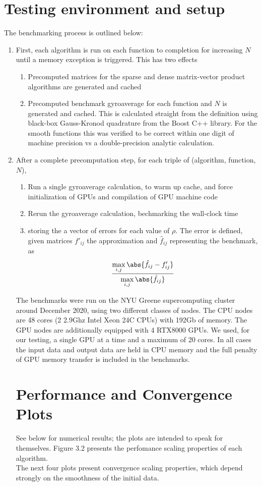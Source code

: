 \section{Testing environment and setup\label{sec:Environment}}
The benchmarking process is outlined below:
\begin{enumerate}
	\item First, each algorithm is run on each function to completion for increasing $N$ until a memory exception is triggered.  This has two effects
	\begin{enumerate}
		\item Precomputed matrices for the sparse and dense matrix-vector product algorithms are generated and cached
		\item Precomputed benchmark gyroaverage for each function and $N$ is generated and cached.  This is calculated straight from the definition using black-box Gauss-Kronod quadrature from the Boost C++ library.  For the smooth functions this was verified to be correct within one digit of machine precision vs a double-precision analytic calculation.  
	\end{enumerate}
	\item After a complete precomputation step, for each triple of (algorithm, function, $N$),
	\begin{enumerate}
		\item Run a single gyroaverage calculation, to warm up cache, and force initialization of GPUs and compilation of GPU machine code
		\item Rerun the gyroaverage calculation, bechmarking the wall-clock time
		\item storing the a vector of errors for each value of $\rho$.  The error is defined, given matrices $f'_{ij}$ the approximation and $\hat{f}_{ij}$ representing the benchmark, as
		\[  \frac{\max\limits_{i,j} \abs{\hat{f}_{ij} - f'_{ij} } }{\max\limits_{i,j} \abs{\hat{f}_{ij}} } \] 
	\end{enumerate}
	The benchmarks were run on the NYU Greene supercomputing cluster around December 2020, using two different classes of nodes.  The CPU nodes are 48 cores (2 2.9Ghz Intel Xeon 24C CPUs) with 192Gb of memory.  The GPU nodes are additionally equipped with 4 RTX8000 GPUs.  We used, for our testing, a single GPU at a time and a maximum of 20 cores.  In all cases the input data and output data are held in CPU memory and the full penalty of GPU memory transfer is included in the benchmarks.  
	\section{Performance and Convergence Plots}
	See below for numerical results; the plots are intended to speak for themselves.
Figure 3.2 presents the perfomance scaling properties of each algorithm.  \\
The next four plots present convergence scaling properties, which depend strongly on the smoothness of the initial data.


\end{enumerate}
